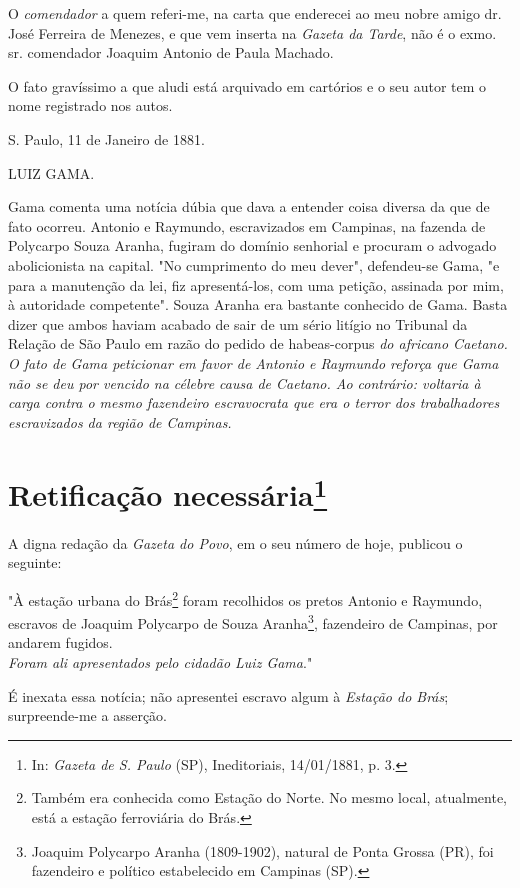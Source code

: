 {O \emph{comendador} a quem referi-me, na carta que enderecei ao meu
nobre amigo dr. José Ferreira de Menezes, e que vem inserta na
\emph{Gazeta da Tarde}, não é o exmo. sr. comendador Joaquim Antonio de
Paula Machado.

O fato gravíssimo a que aludi está arquivado em cartórios e o seu autor
tem o nome registrado nos autos.

S. Paulo, 11 de Janeiro de 1881.

LUIZ GAMA.

\pagebreak
\mbox{}\vfill
\thispagestyle{empty}

{\small\noindent
Gama comenta uma notícia dúbia que dava a entender coisa diversa
da que de fato ocorreu. Antonio e Raymundo, escravizados em Campinas, na
fazenda de Polycarpo Souza Aranha, fugiram do domínio senhorial e
procuram o advogado abolicionista na capital. "No cumprimento do meu
dever", defendeu-se Gama, "e para a manutenção da lei, fiz
apresentá-los, com uma petição, assinada por mim, à autoridade
competente". Souza Aranha era bastante conhecido de Gama. Basta dizer
que ambos haviam acabado de sair de um sério litígio no Tribunal da
Relação de São Paulo em razão do pedido de} habeas-corpus \emph{do
africano Caetano. O fato de Gama peticionar em favor de Antonio e
Raymundo reforça que Gama não se deu por vencido na célebre causa de
Caetano. Ao contrário: voltaria à carga contra o mesmo fazendeiro
escravocrata que era o terror dos trabalhadores escravizados da região
de Campinas. }

\chapter{Retificação necessária\footnote[*]{In: \emph{Gazeta de S.
  Paulo} (SP), Ineditoriais, 14/01/1881, p. 3.}}


A digna redação da \emph{Gazeta do Povo}, em o seu número de hoje,
publicou o seguinte:

"À estação urbana do Brás\footnote{Também era conhecida como Estação
  do Norte. No mesmo local, atualmente, está a estação ferroviária do
  Brás.} foram recolhidos os pretos Antonio e Raymundo, escravos de
Joaquim Polycarpo de Souza Aranha\footnote{Joaquim Polycarpo Aranha
  (1809-1902), natural de Ponta Grossa (PR), foi fazendeiro e político
  estabelecido em Campinas (SP).},
fazendeiro de Campinas, por
andarem fugidos.\\
\emph{Foram ali apresentados pelo cidadão Luiz Gama}."

É inexata essa notícia; não apresentei escravo algum à \emph{Estação do
Brás}; surpreende-me a asserção.

}
